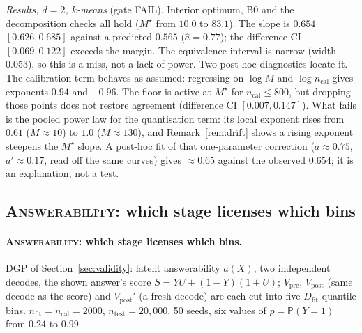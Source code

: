 \documentclass[11pt]{article}
\theoremstyle{definition}
\theoremstyle{remark}
\newcommand{\Dfit}{D_{\mathrm{fit}}}
\renewcommand{\P}{\mathbb{P}}
\newcommand{\1}{\mathbf{1}}
\newcommand{\expname}[1]{\textsc{#1}}
\begin{document}
\emph{Results, $d=2$, $k$-means} (gate FAIL). Interior optimum, B0 and the decomposition checks all hold
($M^\star$ from $10.0$ to $83.1$). The slope is $0.654$ $[0.626,0.685]$ against a predicted
$0.565$ ($\hat a=0.77$); the difference CI $[0.069,0.122]$ exceeds the margin. The equivalence interval is narrow (width $0.053$), so this is a miss, not a lack of power.
Two post-hoc diagnostics locate it. The calibration term behaves as assumed: regressing on
$\log M$ and $\log n_{\mathrm{cal}}$ gives exponents $0.94$ and $-0.96$. The floor is active at
$M^\star$ for $n_{\mathrm{cal}}\le800$, but dropping those points does not restore agreement
(difference CI $[0.007,0.147]$). What fails is the pooled power law for the quantisation term:
its local exponent rises from $0.61$ ($M\approx10$) to $1.0$ ($M\approx130$), and
Remark~\ref{rem:drift} shows a rising exponent steepens the $M^\star$ slope. A post-hoc fit of
that one-parameter correction ($a\approx0.75$, $a'\approx0.17$, read off the same curves) gives
$\approx0.65$ against the observed $0.654$; it is an explanation, not a test.
\subsection{\expname{Answerability}: which stage licenses which bins}
\label{app:x4}
\paragraph{\expname{Answerability}: which stage licenses which bins.}
DGP of Section~\ref{sec:validity}: latent answerability $a(X)$, two independent decodes, the
shown answer's score $S=YU+(1-Y)(1+U)$; $V_{\mathrm{pre}}$, $V_{\mathrm{post}}$ (same decode
as the score) and $V_{\mathrm{post}}'$ (a fresh decode) are each cut into five $\Dfit$-quantile
bins. $n_{\mathrm{fit}}=n_{\mathrm{cal}}=2000$, $n_{\mathrm{test}}=20{,}000$, 50 seeds, six
values of $p=\P(Y=1)$ from $0.24$ to $0.99$. 
\end{document}

